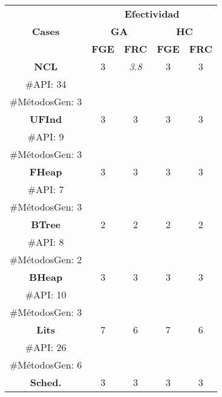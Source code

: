 \begin{table}[H]
\centering
\scriptsize
\begin{tabular}{c ccccc}
\midrule
\multicolumn{2}{c}{\multirow{3}{*}{\textbf{Cases}}} & \multicolumn{4}{c}{\textbf{Efectividad}} \\
\cline{3-6}
\multicolumn{2}{c}{} & \multicolumn{2}{c}{\textbf{GA}} & \multicolumn{2}{c}{\textbf{HC}}  \\
\multicolumn{2}{c}{} & \textbf{\tiny{FGE}} & \textbf{\tiny{FRC}} & \textbf{\tiny{FGE}} & \textbf{\tiny{FRC}}  \\
\midrule
\multicolumn{2}{c}{\textbf{NCL}} & 3  &   \cellcolor{gray!25} \emph{3.8} & 3 &  3 \\
\multicolumn{2}{c}{\tiny \#API: 34} &  &   & &    \\
\multicolumn{2}{c}{\tiny \#MétodosGen: 3} &  &   & &    \\

\midrule
\multicolumn{2}{c}{\textbf{UFInd}}& 3 & 3  & 3  & 3      \\
\multicolumn{2}{c}{\tiny \#API: 9} &  &   & &   \\
\multicolumn{2}{c}{\tiny \#MétodosGen: 3} &  &   & &    \\
\midrule

\multicolumn{2}{c}{\textbf{FHeap}}& 3 & 3  &  3 &  3   \\
\multicolumn{2}{c}{\tiny \#API: 7} &  &   & &    \\
\multicolumn{2}{c}{\tiny \#MétodosGen: 3} &  &   & &    \\
\midrule
\multicolumn{2}{c}{\textbf{BTree}} & 2 & 2  &  2 &  2   \\
\multicolumn{2}{c}{\tiny \#API: 8} &  &   & &    \\
\multicolumn{2}{c}{\tiny \#MétodosGen: 2} &  &   & &    \\
\midrule
\multicolumn{2}{c}{\textbf{BHeap}}& 3 & 3 &  3 &  3    \\
\multicolumn{2}{c}{\tiny \#API: 10} &  &   & &   \\
\multicolumn{2}{c}{\tiny \#MétodosGen: 3} &  &   & &   \\
\midrule
\multicolumn{2}{c}{\textbf{Lits}} &  7 & 6 & 7 &  6    \\
\multicolumn{2}{c}{\tiny \#API: 26} &  &   & &    \\
\multicolumn{2}{c}{\tiny \#MétodosGen: 6} &  &   & &   \\
\midrule
\multicolumn{2}{c}{\textbf{Sched.}} &  3 & 3   & 3  &  3 \\


\end{tabular}
\end{table}

